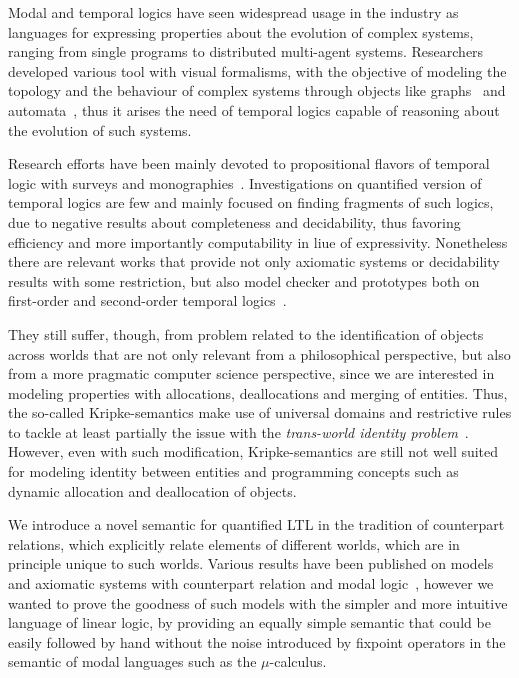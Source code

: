 Modal and temporal logics have seen widespread usage in the industry as languages for expressing properties about the
evolution of complex systems, ranging from single programs to distributed multi-agent systems. Researchers developed
various tool with visual formalisms, with the objective of modeling the topology and the behaviour of complex systems
through objects like graphs~\cite{fiadeiro_temporal_2007} and automata~\cite{montanari_structured_2005}, thus it arises
the need of temporal logics capable of reasoning about the evolution of such systems.

Research efforts have been mainly devoted to propositional flavors of temporal logic with surveys and
monographies~\cite{pnueli_temporal_1977,kroger_temporal_2008}. Investigations on quantified version of temporal logics
are few and mainly focused on finding fragments of such logics, due to negative results about completeness and
decidability, thus favoring efficiency and more importantly computability in liue of expressivity. Nonetheless there are
relevant works that provide not only axiomatic systems or decidability results with some restriction, but also model
checker and prototypes both on first-order and second-order temporal
logics~\cite{boneva_graph_2007,hutchison_model_2006,baeza-yates_model_2002}.

They still suffer, though, from problem related to the identification of objects across worlds that are not only
relevant from a philosophical perspective, but also from a more pragmatic computer science perspective, since we are
interested in modeling properties with allocations, deallocations and merging of entities. Thus, the so-called
Kripke-semantics make use of universal domains and restrictive rules to tackle at least partially the issue with the
\emph{trans-world identity problem}~\cite{lewis_plurality_2001}. However, even with such modification, Kripke-semantics
are still not well suited for modeling identity between entities and programming concepts such as dynamic allocation and
deallocation of objects.

We introduce a novel semantic for quantified \ac{LTL} in the tradition of counterpart relations, which explicitly relate
elements of different worlds, which are in principle unique to such worlds. Various results have been published on
models and axiomatic systems with counterpart relation and modal
logic~\cite{hutchison_counterpart_2010,belardinelli_quantified_2021}, however we wanted to prove the goodness of such
models with the simpler and more intuitive language of linear logic, by providing an equally simple semantic that could
be easily followed by hand without the noise introduced by fixpoint operators in the semantic of modal languages such as
the $\mu$-calculus.

